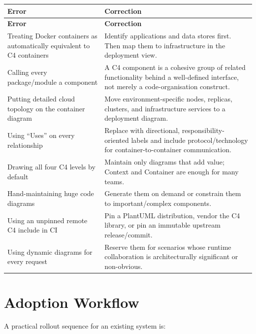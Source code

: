 \documentclass[11pt]{article}
\begin{document}
\begin{longtable}{>{\raggedright\arraybackslash}p{} >{\raggedright\arraybackslash}p{}}
\toprule
\textbf{Error} & \textbf{Correction} \\
\midrule
\endfirsthead
\toprule
\textbf{Error} & \textbf{Correction} \\
\midrule
\endhead
Treating Docker containers as automatically equivalent to C4 containers & Identify applications and data stores first. Then map them to infrastructure in the deployment view. \\
Calling every package/module a component & A C4 component is a cohesive group of related functionality behind a well-defined interface, not merely a code-organisation construct.\cite{c4componentabs} \\
Putting detailed cloud topology on the container diagram & Move environment-specific nodes, replicas, clusters, and infrastructure services to a deployment diagram.\cite{c4deployment} \\
Using ``Uses'' on every relationship & Replace with directional, responsibility-oriented labels and include protocol/technology for container-to-container communication.\cite{c4notation} \\
Drawing all four C4 levels by default & Maintain only diagrams that add value; Context and Container are enough for many teams.\cite{c4diagrams} \\
Hand-maintaining huge code diagrams & Generate them on demand or constrain them to important/complex components.\cite{c4code} \\
Using an unpinned remote C4 include in CI & Pin a PlantUML distribution, vendor the C4 library, or pin an immutable upstream release/commit. \\
Using dynamic diagrams for every request & Reserve them for scenarios whose runtime collaboration is architecturally significant or non-obvious.\cite{c4dynamic} \\
\bottomrule
\end{longtable}

\section{Adoption Workflow}

A practical rollout sequence for an existing system is:
\end{document}
